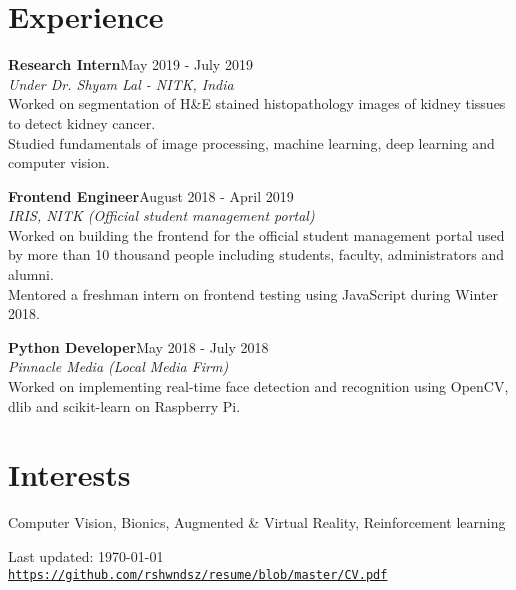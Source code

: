 \documentclass[letterpaper]{article}
\def\footerlink{https://github.com/rshwndsz/resume/blob/master/CV.pdf}
\renewenvironment{itemize}{
  \begin{list}{}{
    \setlength{\leftmargin}{1.5em}
  }
}{
  \end{list}
}
\begin{document}
\section*{Experience}
  \begin{itemize}
    \item \textbf{Research Intern}\hfill{May 2019 - July 2019}\\
    \textit{Under Dr. Shyam Lal - NITK, India}\\
    Worked on segmentation of H\&E stained histopathology images of kidney tissues to detect kidney cancer.\\
    Studied fundamentals of image processing, machine learning, deep learning and computer vision.

    \item \textbf{Frontend Engineer}\hfill{August 2018 - April 2019}\\
    \textit{IRIS, NITK (Official student management portal)}\\
    Worked on building the frontend for the official student management portal used by more than 10 thousand people including students, faculty, administrators and alumni.\\
    Mentored a freshman intern on frontend testing using JavaScript during Winter 2018.

    \item \textbf{Python Developer}\hfill{May 2018 - July 2018}\\
    \textit{Pinnacle Media (Local Media Firm)}\\
    Worked on implementing real-time face detection and recognition using OpenCV, dlib and scikit-learn on Raspberry Pi.
  \end{itemize}

\section*{Interests}
  \begin{itemize}
    \item Computer Vision, Bionics, Augmented \& Virtual Reality, Reinforcement learning
  \end{itemize}

\bigskip

\begin{center}
  \begin{footnotesize}
    Last updated: \today \\
    \href{\footerlink}{\texttt{\footerlink}}
  \end{footnotesize}
\end{center}
\end{document}
